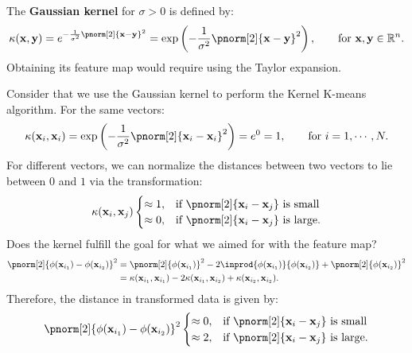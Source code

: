 \documentclass{huhtakm-template-book-v2}
\begin{document}
    \begin{eg}
        The \textbf{Gaussian kernel} for $\sigma>0$ is defined by:
        \begin{equation*}
            \kappa(\mathbf{x},\mathbf{y})=e^{-\frac{1}{\sigma^{2}}\pnorm[2]{\mathbf{x}-\mathbf{y}}^{2}}=\exp\left(-\frac{1}{\sigma^{2}}\pnorm[2]{\mathbf{x}-\mathbf{y}}^{2}\right), \qquad \text{for }\mathbf{x},\mathbf{y}\in \mathbb{R}^{n}.
        \end{equation*}
        Obtaining its feature map would require using the Taylor expansion.
    \end{eg}
    \begin{eg}
        Consider that we use the Gaussian kernel to perform the Kernel K-means algorithm. For the same vectors:
        \begin{equation*}
            \kappa(\mathbf{x}_{i},\mathbf{x}_{i})=\exp\left(-\frac{1}{\sigma^{2}}\pnorm[2]{\mathbf{x}_{i}-\mathbf{x}_{i}}^{2}\right)=e^{0}=1, \qquad \text{for }i=1,\cdots,N.
        \end{equation*}
        For different vectors, we can normalize the distances between two vectors to lie between $0$ and $1$ via the transformation:
        \begin{equation*}
            \kappa(\mathbf{x}_{i},\mathbf{x}_{j})\begin{cases}
                \approx 1, &\text{if }\pnorm[2]{\mathbf{x}_{i}-\mathbf{x}_{j}}\text{ is small}\\
                \approx 0, &\text{if }\pnorm[2]{\mathbf{x}_{i}-\mathbf{x}_{j}}\text{ is large}.
            \end{cases}
        \end{equation*}
        Does the kernel fulfill the goal for what we aimed for with the feature map?
        \begin{align*}
            \pnorm[2]{\phi(\mathbf{x}_{i_{1}})-\phi(\mathbf{x}_{i_{2}})}^{2}&=\pnorm[2]{\phi(\mathbf{x}_{i_{1}})}^{2}-2\inprod{\phi(\mathbf{x}_{i_{1}})}{\phi(\mathbf{x}_{i_{2}})}+\pnorm[2]{\phi(\mathbf{x}_{i_{2}})}^{2}\\
            &=\kappa(\mathbf{x}_{i_{1}},\mathbf{x}_{i_{1}})-2\kappa(\mathbf{x}_{i_{1}},\mathbf{x}_{i_{2}})+\kappa(\mathbf{x}_{i_{2}},\mathbf{x}_{i_{2}}).
        \end{align*}
        Therefore, the distance in transformed data is given by:
        \begin{equation*}
            \pnorm[2]{\phi(\mathbf{x}_{i_{1}})-\phi(\mathbf{x}_{i_{2}})}^{2}\begin{cases}
                \approx 0, &\text{if }\pnorm[2]{\mathbf{x}_{i}-\mathbf{x}_{j}}\text{ is small}\\
                \approx 2, &\text{if }\pnorm[2]{\mathbf{x}_{i}-\mathbf{x}_{j}}\text{ is large}.
            \end{cases}
        \end{equation*}
    \end{eg}
\end{document}
